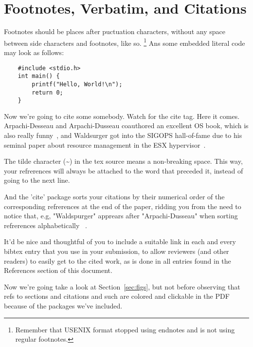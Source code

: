 \section{Footnotes, Verbatim, and Citations}
Footnotes should be places after puctuation characters, without any space 
between side characters and footnotes, like so.
\footnote{
    Remember that USENIX format stopped using endnotes and is not using regular
    footnotes.}
Ans some embedded literal code may look as follows:
\begin{verbatim}
    #include <stdio.h>
    int main() {
        printf("Hello, World!\n");
        return 0;
    }
\end{verbatim}

Now we're going to cite some somebody. Watch for the cite tag. Here it comes.
Arpachi-Desseau and Arpachi-Dusseau coauthored an excellent OS book, which is 
also really funny~\cite{arpachiDusseau18:osbook}, and Waldsurger got into the 
SIGOPS hall-of-fame due to his seminal paper about resource management in the
ESX hypervisor~\cite{waldspurger02}.

The tilde character (\~{}) in the tex source means a non-breaking 
space. This way, your refrerences will always be attached to the word that 
preceded it, instead of going to the next line.

And the 'cite' package sorts your citations by their numerical order of the 
corresponding refrerences at the end of the paper, ridding you from the need 
to notice that, e.g, "Waldspurger" apprears after "Arpachi-Dusseau" when 
sorting refrerences alphabetically~
\cite{arpachiDusseau18:osbook, waldspurger02}.

It'd be nice and thoughtful of you to include a suitable link in each and 
every bibtex entry that you use in your submission, to allow reviewers 
(and other readers) to easily get to the cited work, as is done in all 
entries found in the References section of this document.

Now we're going take a look at Section~\ref{sec:figs}, but not before
observing that refs to sections and citations and such are colored and
clickable in the PDF because of the packages we've included.


